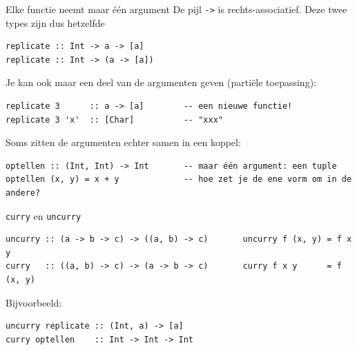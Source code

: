 \documentclass[aspectratio=169,11pt]{beamer}
\newcommand{\hs}{\lstinline[style=hsinline]}
\begin{document}
\begin{frame}[fragile]{Elke functie neemt maar één argument}
  De pijl \hs|->| is rechts-associatief. Deze twee types zijn dus \alert{hetzelfde}
  \begin{lstlisting}
replicate :: Int -> a -> [a]
replicate :: Int -> (a -> [a])
\end{lstlisting}
  Je kan ook maar een deel van de argumenten geven (\alert{partiële toepassing}):
  \begin{lstlisting}
replicate 3      :: a -> [a]        -- een nieuwe functie!
replicate 3 'x'  :: [Char]          -- "xxx"
\end{lstlisting}
  Soms zitten de argumenten echter samen in een \alert{koppel}:
  \begin{lstlisting}
optellen :: (Int, Int) -> Int       -- maar één argument: een tuple
optellen (x, y) = x + y             -- hoe zet je de ene vorm om in de andere?
\end{lstlisting}
\end{frame}

\begin{frame}[fragile]{\texttt{curry} en \texttt{uncurry}}
  \begin{center}
  \end{center}
  \vspace{-4pt}
\begin{lstlisting}
uncurry :: (a -> b -> c) -> ((a, b) -> c)       uncurry f (x, y) = f x y
curry   :: ((a, b) -> c) -> (a -> b -> c)       curry f x y      = f (x, y)
\end{lstlisting}
  Bijvoorbeeld:
\begin{lstlisting}
uncurry replicate :: (Int, a) -> [a]
curry optellen    :: Int -> Int -> Int
\end{lstlisting}
\end{frame}
\end{document}
